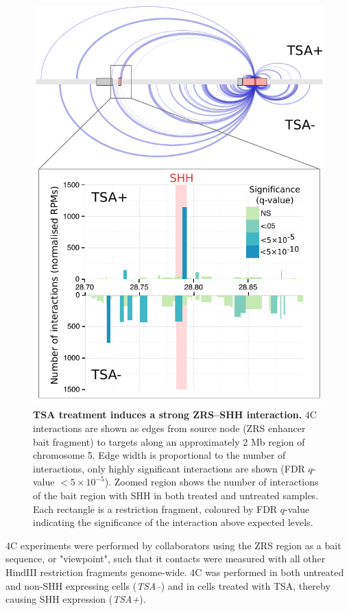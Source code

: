 \documentclass[a4paper,10pt,oneside]{book}
\begin{document}
\begin{figure}
\begin{center} 
\includegraphics[width=.8\textwidth]{figs/shharc_full.pdf}
\captionsetup{width=\textwidth} 
\caption[TSA treatment induces a strong ZRS--SHH interaction. ]{ {\bf TSA treatment induces a strong ZRS--SHH interaction. }
4C interactions are shown as edges from source node (ZRS enhancer bait fragment) to targets along an approximately 2 Mb region of chromosome 5. Edge width is proportional to the number of interactions, only highly significant interactions are shown (FDR $q$-value $<5 \times 10 ^{-5}$). Zoomed region shows the number of interactions of the bait region with SHH in both treated and untreated samples. Each rectangle is a restriction fragment, coloured by FDR $q$-value indicating the significance of the interaction above expected levels.
}\label{fig:ssharc}
\end{center} 
\end{figure} 

4C experiments were performed by collaborators using the ZRS region as a bait sequence, or "viewpoint", such that it contacts were measured with all other HindIII restriction fragments genome-wide. 4C was performed in both untreated and non-SHH expressing cells (\emph{TSA--}) and in cells treated with TSA, thereby causing SHH expression (\emph{TSA+}). 
\end{document}
